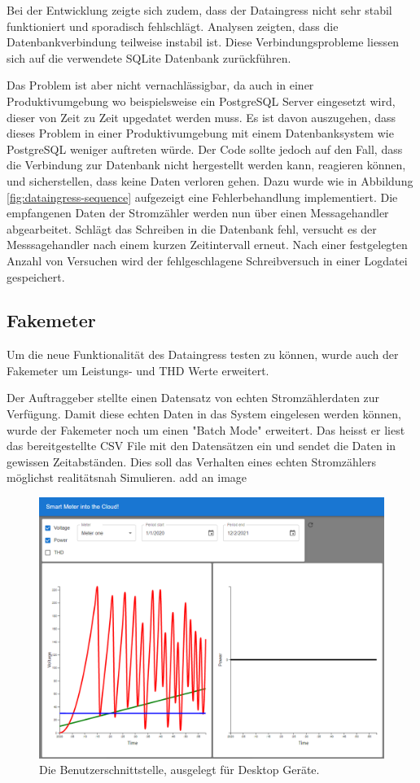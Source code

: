 Bei der Entwicklung zeigte sich zudem, dass der Dataingress nicht sehr stabil
funktioniert und sporadisch fehlschlägt. Analysen zeigten, dass
die Datenbankverbindung teilweise instabil ist. 
Diese Verbindungsprobleme liessen sich auf die verwendete SQLite Datenbank zurückführen.

Das Problem ist aber nicht vernachlässigbar, da auch in einer
Produktivumgebung wo beispielsweise ein PostgreSQL Server eingesetzt wird,
dieser von Zeit zu Zeit upgedatet werden muss.
Es ist davon auszugehen, dass dieses Problem in einer Produktivumgebung mit einem Datenbanksystem wie PostgreSQL
weniger auftreten würde.
Der Code sollte jedoch auf den Fall, dass die Verbindung zur Datenbank nicht hergestellt werden kann, reagieren können,
und sicherstellen, dass keine Daten verloren gehen.
Dazu wurde wie in Abbildung \ref{fig:dataingress-sequence} aufgezeigt
eine Fehlerbehandlung implementiert. 
Die empfangenen Daten der Stromzähler
werden nun über einen Messagehandler abgearbeitet.
Schlägt das Schreiben in die Datenbank fehl, versucht es der Messsagehandler nach einem kurzen Zeitintervall erneut.
Nach einer festgelegten Anzahl von Versuchen wird der fehlgeschlagene Schreibversuch in einer Logdatei gespeichert.

\subsection{Fakemeter}

Um die neue Funktionalität des Dataingress testen zu können, wurde auch der
Fakemeter um Leistungs- und \ac{THD} Werte erweitert.

Der Auftraggeber stellte einen Datensatz von echten Stromzählerdaten
zur Verfügung. Damit diese echten Daten in das System eingelesen werden können,
wurde der Fakemeter noch um einen "Batch Mode" erweitert. Das heisst
er liest das bereitgestellte CSV File mit den Datensätzen ein und sendet die Daten in
gewissen Zeitabständen. Dies soll das Verhalten eines echten Stromzählers
möglichst realitätsnah Simulieren.
add an image
\begin{figure}
    \centering
    \includegraphics[width=1.0\textwidth]{gfx/phase2}
    \caption{
        Die Benutzerschnittstelle, ausgelegt für Desktop Geräte.
    }
    \label{fig:phase2-ui}
\end{figure}

